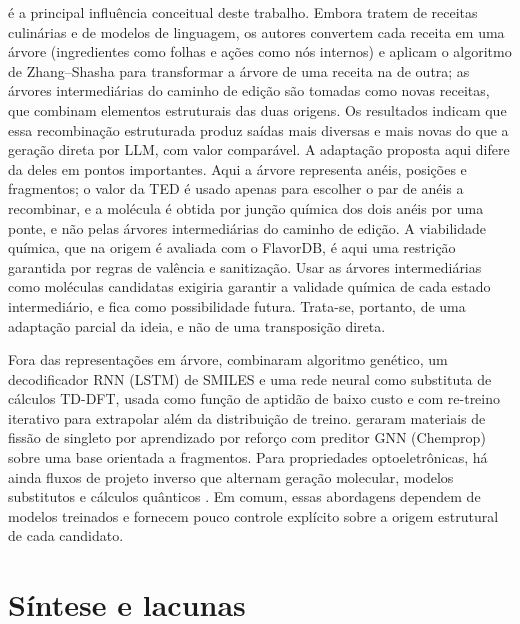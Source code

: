  é a principal influência conceitual deste trabalho. Embora tratem de receitas culinárias e de modelos de linguagem, os autores convertem cada receita em uma árvore (ingredientes como folhas e ações como nós internos) e aplicam o algoritmo de Zhang--Shasha para transformar a árvore de uma receita na de outra; as árvores intermediárias do caminho de edição são tomadas como novas receitas, que combinam elementos estruturais das duas origens. Os resultados indicam que essa recombinação estruturada produz saídas mais diversas e mais novas do que a geração direta por LLM, com valor comparável. A adaptação proposta aqui difere da deles em pontos importantes. Aqui a árvore representa anéis, posições e fragmentos; o valor da TED é usado apenas para escolher o par de anéis a recombinar, e a molécula é obtida por junção química dos dois anéis por uma ponte, e não pelas árvores intermediárias do caminho de edição. A viabilidade química, que na origem é avaliada com o FlavorDB, é aqui uma restrição garantida por regras de valência e sanitização. Usar as árvores intermediárias como moléculas candidatas exigiria garantir a validade química de cada estado intermediário, e fica como possibilidade futura. Trata-se, portanto, de uma adaptação parcial da ideia, e não de uma transposição direta.

Fora das representações em árvore,  combinaram algoritmo genético, um decodificador RNN (LSTM) de SMILES e uma rede neural como substituta de cálculos TD-DFT, usada como função de aptidão de baixo custo e com re-treino iterativo para extrapolar além da distribuição de treino.  geraram materiais de fissão de singleto por aprendizado por reforço com preditor GNN (Chemprop) sobre uma base orientada a fragmentos. Para propriedades optoeletrônicas, há ainda fluxos de projeto inverso que alternam geração molecular, modelos substitutos e cálculos quânticos \cite{inverse_design_2023}. Em comum, essas abordagens dependem de modelos treinados e fornecem pouco controle explícito sobre a origem estrutural de cada candidato.


\section{Síntese e lacunas}
\label{sec:sintese-lacunas}


